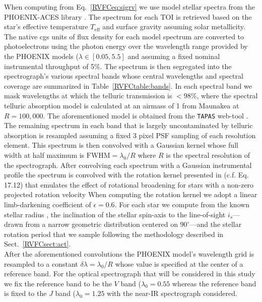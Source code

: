 When computing \sigRV{} from Eq.~\ref{RVFCeq:sigrv}
we use model stellar spectra from the PHOENIX-ACES library \citep{husser13}.
The spectrum for each TOI is retrieved based on the star's effective temperature $T_{\text{eff}}$ and 
surface gravity 
assuming solar metallicity. The native cgs units of flux density for each model spectrum
are converted to photoelectrons using the photon energy over the wavelength range provided by the
PHOENIX models ($\lambda \in [0.05,5.5]$ \micron{)} and assuming a fixed nominal
instrumental throughput of 5\%.
The spectrum is then segregated into the spectrograph's various spectral bands whose central wavelengths
and spectral coverage are summarized in Table~\ref{RVFCtable:bands}. In each spectral band we mask
wavelengths at which the telluric transmission is $< 98$\%, where the
spectral telluric absorption model is calculated at an airmass of 1 from Maunakea at $R=100,000$.
The aforementioned model is obtained from the \texttt{TAPAS} web-tool \citep{bertaux14}.
The remaining spectrum in each band that is largely uncontaminated by telluric absorption
is resampled assuming a fixed 3 pixel PSF sampling of each resolution element.
This spectrum is then convolved with a Gaussian kernel whose full width at half maximum is
$\text{FWHM} = \lambda_0 / R$ where $R$ is the spectral resolution of the spectrograph.
After convolving each spectrum with a Gaussian instrumental profile
the spectrum is convolved with the rotation kernel presented in \cite{gray08}
(c.f. Eq. 17.12) that emulates
the effect of rotational broadening for stars with a non-zero projected rotation velocity 
When computing the rotation kernel we adopt a linear limb-darkening coefficient of $\epsilon=0.6$.
For each star we compute \vsini{} from the known stellar radius , the
inclination of the stellar spin-axis to the line-of-sight $i_s$---drawn from a narrow geometric
distribution centered on $90^{\circ}$---and the stellar rotation period \prot{,} 
that we sample following the methodology described in Sect.~\ref{RVFCsect:act}. \\



After the aforementioned convolutions the PHOENIX model's wavelength grid is resampled to a
constant $\delta \lambda = \lambda_0 / R$ whose value is specified at the center of a reference band.
For the optical spectrograph that will be considered in this study we fix the reference band to be
the $V$ band ($\lambda_0 = 0.55$ \micron{)} whereas the reference band is fixed to the $J$ band
($\lambda_0 = 1.25$ \micron{)} with the near-IR spectrograph considered. \\

